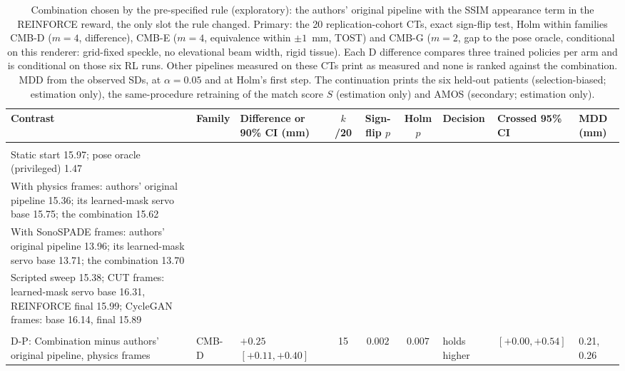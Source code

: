 
\begin{table}[tp]
\renewcommand{\baselinestretch}{1}\scriptsize
\caption{Combination chosen by the pre-specified rule (exploratory): the authors' original pipeline with the SSIM appearance term in the REINFORCE reward, the only slot the rule changed. Primary: the 20 replication-cohort CTs, exact sign-flip test, Holm within families CMB-D ($m = 4$, difference), CMB-E ($m = 4$, equivalence within $\pm 1$~mm, TOST) and CMB-G ($m = 2$, gap to the pose oracle, conditional on this renderer: grid-fixed speckle, no elevational beam width, rigid tissue). Each D difference compares three trained policies per arm and is conditional on those six RL runs. Other pipelines measured on these CTs print as measured and none is ranked against the combination. MDD from the observed SDs, at $\alpha = 0.05$ and at Holm's first step. The continuation prints the six held-out patients (selection-biased; estimation only), the same-procedure retraining of the match score $S$ (estimation only) and AMOS (secondary; estimation only).}
\label{tab:combination}
\centering
\setlength{\tabcolsep}{3pt}
\begin{tabularx}{\textwidth}{@{}>{\raggedright\arraybackslash}X l l c c c >{\raggedright\arraybackslash}p{} l l@{}}
\toprule
Contrast & Family & Difference or 90\% CI (mm) & $k$/20 & Sign-flip $p$ & Holm $p$ & Decision & Crossed 95\% CI & MDD (mm) \\
\midrule
\multicolumn{9}{@{}l}{\textit{Pipelines on the 20 cohort CTs, final translation error (mm), as measured and unranked}} \\
\quad Static start 15.97; pose oracle (privileged) 1.47 & & & & & & & & \\
\quad With physics frames: authors' original pipeline 15.36; its learned-mask servo base 15.75; the combination 15.62 & & & & & & & & \\
\quad With SonoSPADE frames: authors' original pipeline 13.96; its learned-mask servo base 13.71; the combination 13.70 & & & & & & & & \\
\quad Scripted sweep 15.38; CUT frames: learned-mask servo base 16.31, REINFORCE final 15.99; CycleGAN frames: base 16.14, final 15.89 & & & & & & & & \\
\addlinespace
\multicolumn{9}{@{}l}{\textit{Families on the cohort CTs}} \\
\quad D-P: Combination minus authors' original pipeline, physics frames & CMB-D & $+0.25$ $[+0.11, +0.40]$ & 15 & $0.002$ & $0.007$ & holds higher & $[+0.00, +0.54]$ & 0.21, 0.26 \\

\end{tabularx}
\end{table}
